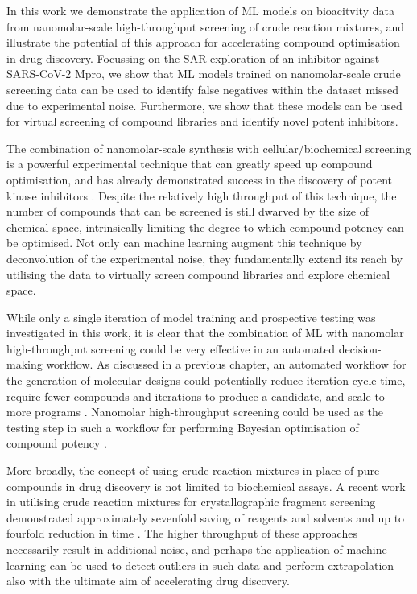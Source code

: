 In this work we demonstrate the application of ML models on bioacitvity data from nanomolar-scale high-throughput screening of crude reaction mixtures, and illustrate the potential of this approach for accelerating compound optimisation in drug discovery. Focussing on the SAR exploration of an inhibitor against SARS-CoV-2 Mpro, we show that ML models trained on nanomolar-scale crude screening data can be used to identify false negatives within the dataset missed due to experimental noise. Furthermore, we show that these models can be used for virtual screening of compound libraries and identify novel potent inhibitors.

The combination of nanomolar-scale synthesis with cellular/biochemical screening is a powerful experimental technique that can greatly speed up compound optimisation, and has already demonstrated success in the discovery of potent kinase inhibitors \cite{Gesmundo2018nanosar, Gehrtz2022nanomolar}. Despite the relatively high throughput of this technique, the number of compounds that can be screened is still dwarved by the size of chemical space, intrinsically limiting the degree to which compound potency can be optimised. Not only can machine learning augment this technique by deconvolution of the experimental noise, they fundamentally extend its reach by utilising the data to virtually screen compound libraries and explore chemical space.

While only a single iteration of model training and prospective testing was investigated in this work, it is clear that the combination of ML with nanomolar high-throughput screening could be very effective in an automated decision-making workflow. As discussed in a previous chapter, an automated workflow for the generation of molecular designs could potentially reduce iteration cycle time, require fewer compounds and iterations to produce a candidate, and scale to more programs \cite{Schneider2018AutomatingDrugDiscovery, Coley2020Outlook, Goldman2022ChemicalDesignLevels}. Nanomolar high-throughput screening could be used as the testing step in such a workflow for performing Bayesian optimisation of compound potency \cite{korovina2019chembo}.

More broadly, the concept of using crude reaction mixtures in place of pure compounds in drug discovery is not limited to biochemical assays. A recent work in utilising crude reaction mixtures for crystallographic fragment screening demonstrated approximately sevenfold saving of reagents and solvents and up to fourfold reduction in time \cite{Baker2020FragementsFromCrude}. The higher throughput of these approaches necessarily result in additional noise, and perhaps the application of machine learning can be used to detect outliers in such data and perform extrapolation also with the ultimate aim of accelerating drug discovery.

